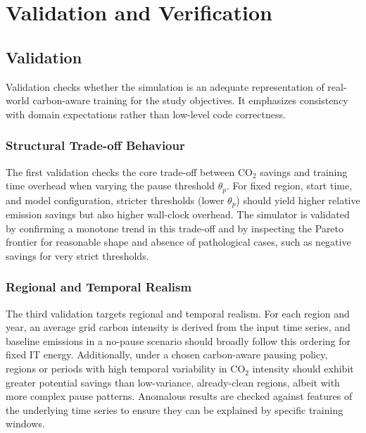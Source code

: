 
\chapter{Validation and Verification}
\label{sec:validation_verification}

\section{Validation}

Validation checks whether the simulation is an adequate representation of
real-world carbon-aware training for the study objectives.  It emphasizes
consistency with domain expectations rather than low-level code correctness.

\subsection{Structural Trade-off Behaviour}

The first validation checks the core trade-off between CO$_2$ savings and
training time overhead when varying the pause threshold $\theta_p$.  For fixed
region, start time, and model configuration, stricter thresholds (lower
$\theta_p$) should yield higher relative emission savings but also higher
wall-clock overhead.  The simulator is validated by confirming a monotone
trend in this trade-off and by inspecting the Pareto frontier for reasonable
shape and absence of pathological cases, such as negative savings for very
strict thresholds.


\subsection{Regional and Temporal Realism}

The third validation targets regional and temporal realism.  For each region
and year, an average grid carbon intensity is derived from the input time
series, and baseline emissions in a no-pause scenario should broadly follow
this ordering for fixed IT energy.  Additionally, under a chosen carbon-aware
pausing policy, regions or periods with high temporal variability in CO$_2$
intensity should exhibit greater potential savings than low-variance,
already-clean regions, albeit with more complex pause patterns.  Anomalous
results are checked against features of the underlying time series to ensure
they can be explained by specific training windows.


